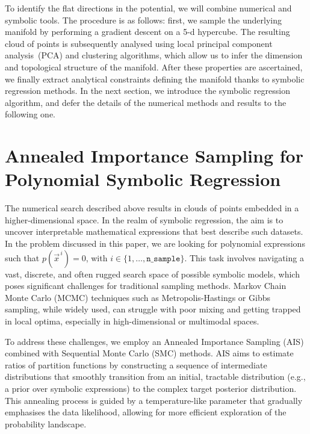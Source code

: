 \documentclass[11pt,a4paper]{article}
\begin{document}
To identify the flat directions in the potential, we will combine numerical and symbolic tools. The procedure is as follows: first, we sample the underlying manifold by performing a gradient descent on a 5-d hypercube. The resulting cloud of points is subsequently analysed using local principal component analysis~(PCA) and clustering algorithms, which allow us to infer the dimension and topological structure of the manifold. After these properties are ascertained, we finally extract analytical constraints defining the manifold thanks to symbolic regression methods. In the next section, we introduce the symbolic regression algorithm, and defer the details of the numerical methods and results to the following one.


\section{Annealed Importance Sampling for Polynomial Symbolic Regression} \label{Sec:AIS-SMC}
	

The numerical search described above results in clouds of points embedded in a higher-dimensional space. 
In the realm of symbolic regression, the aim is to uncover interpretable mathematical expressions that best describe such datasets. In the problem discussed in this paper, we are looking for polynomial expressions such that $p(\vec{x}^{\,i}) = 0$, with $i \in \{1, \dots, \texttt{n\_{sample}}\}$. This task involves navigating a vast, discrete, and often rugged search space of possible symbolic models, which poses significant challenges for traditional sampling methods. Markov Chain Monte Carlo (MCMC) techniques such as Metropolis-Hastings or Gibbs sampling, while widely used, can struggle with poor mixing and getting trapped in local optima, especially in high-dimensional or multimodal spaces.

To address these challenges, we employ an Annealed Importance Sampling (AIS) \cite{neal1998annealedimportancesampling} combined with Sequential Monte Carlo (SMC) methods. 
AIS aims to estimate ratios of partition functions by constructing a sequence of intermediate distributions that smoothly transition from an initial, tractable distribution (e.g., a prior over symbolic expressions) to the complex target posterior distribution. This annealing process is guided by a temperature-like parameter that gradually emphasises the data likelihood, allowing for more efficient exploration of the probability landscape.
\end{document}
